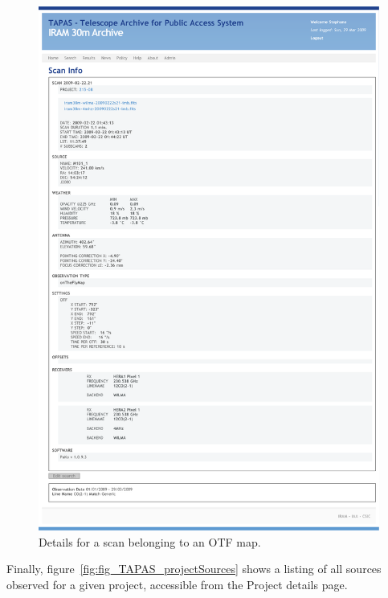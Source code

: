 			\begin{figure}[tbp]
				\centering
					\includegraphics[totalheight=\textheight]
					{fig/TAPAS_scanDetailsOTF.pdf}
				\caption[TAPAS scan detail for an OTF map]
				{Details for a scan belonging to an OTF map.}
				\label{fig:fig_TAPAS_scanDetailsOTF}
			\end{figure}
			
			Finally, figure~\ref{fig:fig_TAPAS_projectSources}
			shows a listing of all sources observed for a given
			project, accessible from the Project details page.
			
